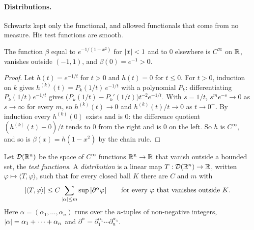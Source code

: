 \begin{notechapter}
\paragraph{Distributions.} Schwartz kept only the functional, and allowed
functionals that come from no measure. His test functions are smooth.

\begin{lemma}\label{change-of-variables:lem:bump}
The function $\beta$ equal to $e^{-1/(1 - x^2)}$ for $\left|x\right| < 1$ and to
$0$ elsewhere is $C^\infty$ on $\mathbb{R}$, vanishes outside $(-1, 1)$, and
$\beta(0) = e^{-1} > 0$.
\end{lemma}

\begin{proof}
Let $h(t) = e^{-1/t}$ for $t > 0$ and $h(t) = 0$ for $t\leq0$. For
$t > 0$, induction on $k$ gives $h^{(k)}(t) = P_k(1/t)\,e^{-1/t}$ with a
polynomial $P_k$: differentiating $P_k(1/t)e^{-1/t}$ gives
$\bigl(P_k(1/t) - P_k'(1/t)\bigr)t^{-2}e^{-1/t}$. With $s = 1/t$,
$s^me^{-s}\to0$ as $s\to\infty$ for every $m$, so $h^{(k)}(t)\to0$ and
$h^{(k)}(t)/t\to0$ as $t\to0^+$. By induction every $h^{(k)}(0)$ exists
and is $0$: the difference quotient $(h^{(k)}(t) - 0)/t$ tends to $0$
from the right and is $0$ on the left. So $h$ is $C^\infty$, and so is
$\beta(x) = h(1 - x^2)$ by the chain rule.
\end{proof}

\begin{definition}[Distribution]\label{change-of-variables:def:distribution}
Let $\mathcal D(\mathbb{R}^n)$ be the space of $C^\infty$ functions
$\mathbb{R}^n\to\mathbb{R}$ that vanish outside a bounded set, the \emph{test
functions}. A \emph{distribution} is a linear map
$T:\mathcal D(\mathbb{R}^n)\to\mathbb{R}$, written $\varphi\mapsto\langle T,
\varphi\rangle$, such that for every closed ball $K$ there are $C$ and
$m$ with
\[
  \left|\langle T, \varphi\rangle\right|
  \leq C\sum_{\left|\alpha\right|\leq m}\sup\left|\partial^\alpha\varphi\right|
  \qquad\text{for every $\varphi$ that vanishes outside $K$.}
\]
Here $\alpha = (\alpha_1,\dots,\alpha_n)$ runs over the $n$-tuples of
non-negative integers, $\left|\alpha\right| = \alpha_1 + \dots + \alpha_n$ and
$\partial^\alpha = \partial_1^{\alpha_1}\cdots\partial_n^{\alpha_n}$.
\end{definition}


\end{notechapter}
